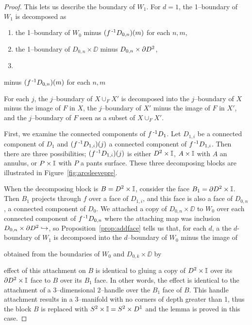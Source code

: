 \begin{proof}
	This lets us describe the boundary of $W_1$.
	For $d=1$, the 1--boundary of $W_1$ is decomposed as
	\begin{enumerate}
		\item the 1--boundary of $W_0$ minus $(f^{\,\text{-}1} D_{0,n})(m)$ for each $n,m$,
		
		\item the 1--boundary of $D_{0,n}\times\DD$ minus $D_{0,n}\times\partial D^2$,
		
		\item 
	\end{enumerate} minus $(f^{\,\text{-}1} D_{0,n})(m)$ for each $n,m$
	
	  
	
	For each $j$, the $j$--boundary of $X\cup_F X'$ is decomposed into the $j$--boundary of $X$ minus the image of $F$ in $X$, the $j$--boundary of $X'$ minus the image of $F$ in $X'$, and the $j$--boundary of $F$ seen as a subset of $X\cup_F X'$.	
	
	
		
	First, we examine the connected components of $f^{\,\text{-}1} D_1$.
	Let $D_{1,i}$ be a connected component of $D_1$ and $(f^{\,\text{-}1} D_{1,i})(j)$ a connected component of $f^{\,\text{-}1} D_{1,i}$.
	Then there are three possibilities; $(f^{\,\text{-}1} D_{1,i})(j)$ is either $D^2\times\mathbb{I}$, $A\times\mathbb{I}$ with $A$ an annulus, or $P\times\mathbb{I}$ with $P$ a pants surface.
	These three decomposing blocks are illustrated in Figure~\ref{fig:arcsleevepre}.
	
	When the decomposing block is $B=D^2\times\mathbb{I}$, consider the face $B_1=\partial D^2\times \mathbb{I}$.
	Then $B_1$ projects through $f$ over a face of $D_{1,i}$, and this face is also a face of $D_{0,n}$, a connected component of $D_0$.
	We attached a copy of $D_{0,n}\times\DD$ to $W_0$ over each connected component of $f^{\,\text{-}1} D_{0,n}$ where the attaching map was inclusion $D_{0,n}\times \partial D^2\hookrightarrow $, so Proposition~\ref{prop:addface} tells us that, for each $d$, a the $d$-boundary of $W_1$ is decomposed into the $d$--boundary of $W_0$ minus the image of 
	
	obtained from the boundaries of $W_0$ and $D_{0,k}\times\DD$ by 
	

	
	effect of this attachment on $B$ is identical to gluing a copy of $D^2\times \mathbb{I}$ over its $\partial D^2\times \mathbb{I}$ face to $B$ over its $B_1$ face.
	In other words, the effect is identical to the attachment of a 3--dimensional 2--handle over the  $B_1$ face of $B$.
	This handle attachment results in a 3--manifold with no corners of depth greater than 1, thus the block $B$ is replaced with $S^2\times\mathbb{I}=S^2\times D^1$ and the lemma is proved in this case.
	

\end{proof}
